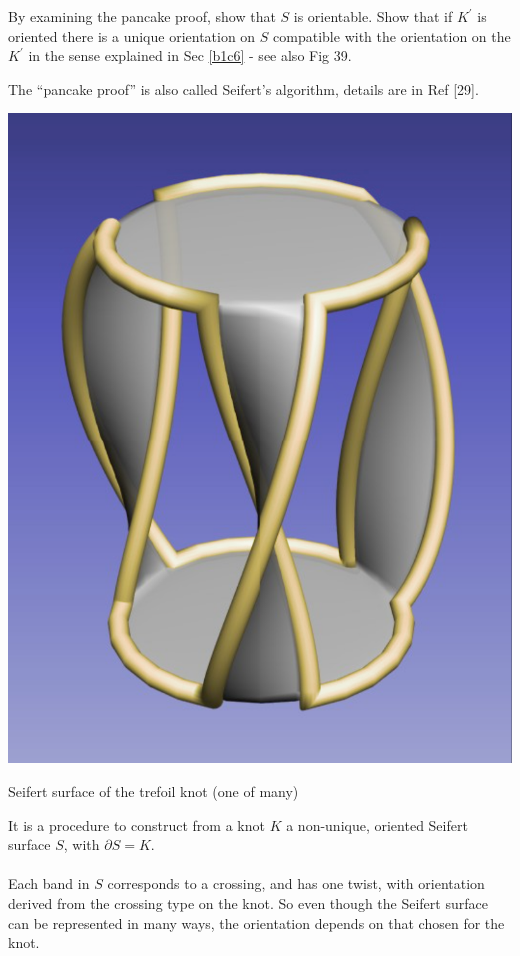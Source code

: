 \documentclass[10pt]{article}
\begin{document}
\begin{example}
	By examining the pancake proof, show that $S$ is orientable. Show that if $K^\prime$ is oriented there is a unique orientation on $S$ compatible with the orientation on the $K^\prime$ in the sense explained in Sec \ref{b1c6} - see also Fig 39.
\end{example}
\sol The ``pancake proof'' is also called Seifert's algorithm, details are in Ref [29].
\begin{marginfigure}
	\begin{center}
	  \includegraphics[width=1.2\textwidth]{figs/trefoil_ss.png}
	\end{center}
	\caption{Seifert surface of the trefoil knot (one of many)}
\end{marginfigure}
It is a procedure to construct from a knot $K$ a non-unique, oriented Seifert surface $S$, with $\partial S=K$.\\\\
Each band in $S$ corresponds to a crossing, and has one twist, with orientation derived from the crossing type on the knot. So even though the Seifert surface can be represented in many ways, the orientation depends on that chosen for the knot.
\end{document}

